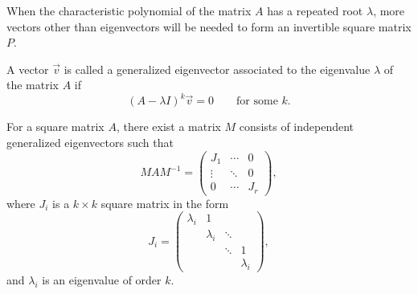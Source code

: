 When the characteristic polynomial of the matrix $A$ has a repeated root $\lambda$, more vectors other than  eigenvectors will be needed to form an invertible square matrix $P$.

A vector $\vec{v}$ is called a generalized eigenvector associated to the eigenvalue $\lambda$ of the matrix $A$ if
\[(A-\lambda I)^k\vec{v}=0\qquad \text{for some } k.\]

\begin{theorem}
  For a square matrix $A$, there exist a matrix $M$ consists of independent generalized eigenvectors such that
  \[
  MAM^{-1}=
    \begin{pmatrix}
      J_1 & \cdots & 0\\
      \vdots & \ddots & 0\\
      0 & \cdots & J_r
    \end{pmatrix}, 
  \]
  where $J_i$ is a $k\times k$ square matrix in the form
  \[
    J_i=\begin{pmatrix}
      \lambda_{i} & 1 & & \\
      & \lambda_{i} & \ddots & \\
      & & \ddots & 1 \\
      & & & \lambda_{i}
    \end{pmatrix},
  \]
  and $\lambda_i$ is an eigenvalue of order $k$.
\end{theorem}

